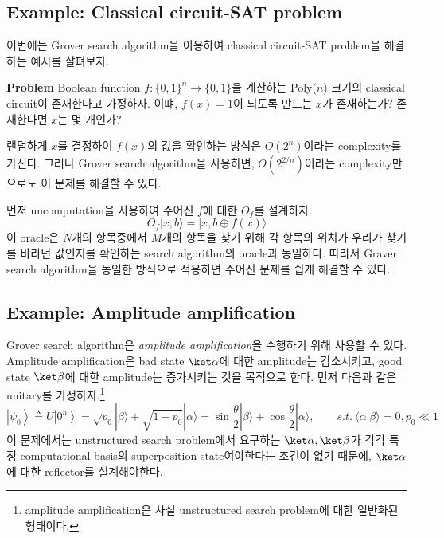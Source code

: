 \subsection{Example: Classical circuit-SAT problem}
이번에는 Grover search algorithm을 이용하여 classical circuit-SAT problem을 해결하는 예시를 살펴보자. 

\textbf{Problem} Boolean function $f: \{0, 1\}^n \rightarrow \{0, 1\}$을 계산하는 Poly($n$) 크기의 classical circuit이 존재한다고 가정하자. 
이떄, $f(x) = 1$이 되도록 만드는 $x$가 존재하는가? 존재한다면 $x$는 몇 개인가?

\vspace{1em}
랜덤하게 $x$를 결정하여 $f(x)$의 값을 확인하는 방식은 $O(2^n)$이라는 complexity를 가진다.
그러나 Grover search algorithm을 사용하면, $O(2^{2/n})$이라는 complexity만으로도 이 문제를 해결할 수 있다. 

\vspace{1em}
먼저 uncomputation을 사용하여 주어진 $f$에 대한 $O_f$를 설계하자.
\begin{equation*}
  O_f|x, b\rangle=|x, b \oplus f(x)\rangle
\end{equation*}
이 oracle은 $N$개의 항목중에서 $M$개의 항목을 찾기 위해 각 항목의 위치가 우리가 찾기를 바라던 값인지를 확인하는 search algorithm의 oracle과 동일하다.
따라서 Graver search algorithm을 동일한 방식으로 적용하면 주어진 문제를 쉽게 해결할 수 있다.

\subsection{Example: Amplitude amplification}\label{sec:amplitude-amplification}
Grover search algorithm은 \textit{amplitude amplification}을 수행하기 위해 사용할 수 있다. Amplitude amplification은 bad state $\ket \alpha$에 대한 amplitude는 감소시키고, good state $\ket \beta$에 대한 amplitude는 증가시키는 것을 목적으로 한다.
먼저 다음과 같은 unitary를 가정하자.\footnote{amplitude amplification은 사실 unstructured search problem에 대한 일반화된 형태이다.}
\begin{equation*}
  \left|\psi_0\right\rangle \triangleq U\left|0^n\right\rangle =\sqrt{p_0}|\beta\rangle+\sqrt{1-p_0}|\alpha\rangle =\sin \frac{\theta}{2}|\beta\rangle+\cos \frac{\theta}{2}|\alpha\rangle, \qquad s.t. \  \langle\alpha |  \beta\rangle=0, p_0 \ll 1
\end{equation*}
이 문제에서는 unstructured search problem에서 요구하는 $\ket \alpha, \ket \beta$가 각각 특정 computational basis의 superposition state여야한다는 조건이 없기 때문에, $\ket \alpha$에 대한 reflector를 설계해야한다.

